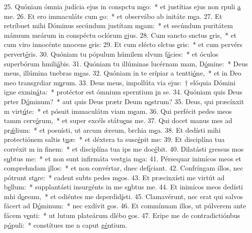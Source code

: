 25. Quóniam ómnia judícia ejus in conspctu m\uline{e}o:~* et justítias ejus non rpuli \uline{a} me.
26. Et ero immaculáts cum \uline{e}o:~* et observábo ab initáte m\uline{e}a.
27. Et retríbuet mihi Dóminus secúndum justítam m\uline{e}am:~* et secúndum puritátem mánuum meárum in conspéctu oclórum \uline{e}jus.
28. Cum sancto snctus \uline{e}ris,~* et cum viro innocénte nnocens \uline{e}ris:
29. Et cum elécto elctus \uline{e}ris:~* et cum pervérs pervert\uline{é}ris.
30. Quóniam tu pópulum húmilem slvum f\uline{á}cies:~* et óculos superbórum hmili\uline{á}bis.
31. Quóniam tu illúminas lucérnam mam, D\uline{ó}mine:~* Deus meus, illúmina tnebras m\uline{e}as.
32. Quóniam in te erípiar a tentti\uline{ó}ne,~* et in Deo meo transgrdiar m\uline{u}rum.
33. Deus meus, impollúta via ejus:~† elóquia Dómini igne exmin\uline{á}ta:~* protéctor est ómnium sperntium \uline{i}n se.
34. Quóniam quis Deus prter D\uline{ó}minum?~* aut quis Deus prætr Deum n\uline{o}strum?
35. Deus, qui præcínxit m virt\uline{ú}te:~* et pósuit immaculátm viam m\uline{e}am.
36. Qui perfécit pedes meos tamm cerv\uline{ó}rum,~* et super excéls státu\uline{e}ns me.
37. Qui docet manus mes ad pr\uline{ǽ}lium:~* et posuísti, ut arcum ǽreum, brchia m\uline{e}a.
38. Et dedísti mihi protectiónem saltis t\uline{u}æ:~* et déxtera ta susc\uline{é}pit me:
39. Et disciplína tua corréxit m in f\uline{i}nem:~* et disciplína tua ips me doc\uline{é}bit.
40. Dilatásti gressus mos s\uline{u}btus me:~* et non sunt infirmáta vestgia m\uline{e}a:
41. Pérsequar inimícos meos et comprehndam \uline{i}llos:~* et non convértar, dnec def\uline{í}ciant.
42. Confríngam illos, nec pótrunt st\uline{a}re:~* cadent subts pedes m\uline{e}os.
43. Et præcinxísti me virtút ad b\uline{e}llum:~* supplantásti insurgénts in me s\uline{u}btus me.
44. Et inimícos meos dedísti mhi d\uline{o}rsum,~* et odiéntes me dsperdid\uline{í}sti.
45. Clamavérunt, nec erat qui salvos fácert ad D\uline{ó}minum:~* nec exdívit \uline{e}os.
46. Et commínuam illos, ut púlverem ante fácem v\uline{e}nti:~* ut lutum plateárum dlébo \uline{e}os.
47. Eripe me de contradictiónbus p\uline{ó}puli:~* constítues me n caput g\uline{é}ntium.
